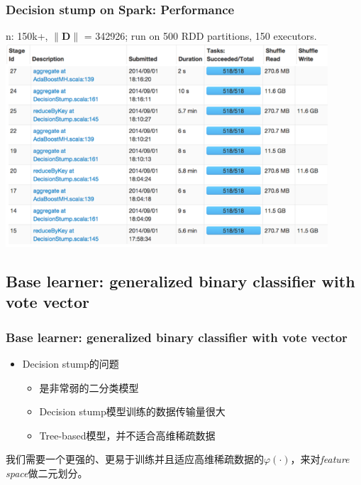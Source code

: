 \documentclass{beamer}
\begin{document}
\begin{frame}
\frametitle{Decision stump on Spark: Performance}
{ \footnotesize
n: 150k+, $\|\mathbf{D}\|$ = 342926; run on 500 RDD partitions, 150 executors.\\
}
\includegraphics[width=0.9\textwidth]{img/ds_perf.png}
\end{frame}

\subsection{Base learner: generalized binary classifier with vote vector}

\begin{frame}
\frametitle{Base learner: generalized binary classifier with vote vector}
\begin{itemize}
\item Decision stump的问题
  \begin{itemize}
    \item 是非常弱的二分类模型
    \item Decision stump模型训练的数据传输量很大
    \item Tree-based模型，并不适合高维稀疏数据
  \end{itemize}
\end{itemize}

\pause

\begin{block}{}
我们需要一个更强的、更易于训练并且适应高维稀疏数据的$\varphi(\cdot)$，来对\textit{feature space}做二元划分。
\end{block}
\end{frame}
\end{document}
